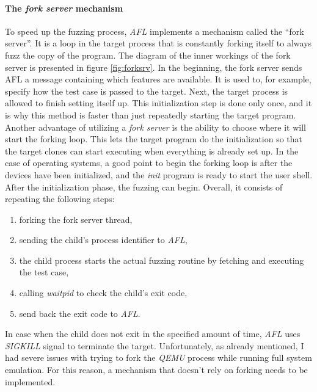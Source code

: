 \paragraph{The \textit{fork server} mechanism}
To speed up the fuzzing process, \textit{AFL} implements a mechanism called the “fork server”. It is a loop in the target process that is constantly forking itself to always fuzz the copy of the program. The diagram of the inner workings of the fork server is presented in figure \ref{fig:forksrv}. In the beginning, the fork server sends AFL a message containing which features are available. It is used to, for example, specify how the test case is passed to the target. Next, the target process is allowed to finish setting itself up. This initialization step is done only once, and it is why this method is faster than just repeatedly starting the target program. Another advantage of utilizing a \textit{fork server} is the ability to choose where it will start the forking loop. This lets the target program do the initialization so that the target clones can start executing when everything is already set up. In the case of operating systems, a good point to begin the forking loop is after the devices have been initialized, and the \textit{init} program is ready to start the user shell. After the initialization phase, the fuzzing can begin. Overall, it consists of repeating the following steps:
\begin{enumerate}
    \item forking the fork server thread,
    \item sending the child's process identifier to \textit{AFL},
    \item the child process starts the actual fuzzing routine by fetching and executing the test case,
    \item calling \textit{waitpid} to check the child's exit code,
    \item send back the exit code to \textit{AFL}.
\end{enumerate}
In case when the child does not exit in the specified amount of time, \textit{AFL} uses \textit{SIGKILL} signal to terminate the target. Unfortunately, as already mentioned, I had severe issues with trying to fork the \textit{QEMU} process while running full system emulation. For this reason, a mechanism that doesn't rely on forking needs to be implemented. 

